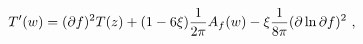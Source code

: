 \begin{equation}\label{2.19}
T'(w)=(\partial f)^2 T(z)+(1-6\xi){1 \over 2\pi} A_f(w)
-\xi{1 \over 8\pi} (\partial \ln \partial f)^2~,
\end{equation}

